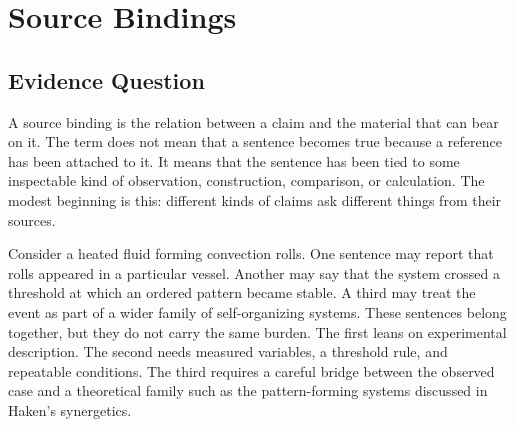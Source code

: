 \documentclass[11pt,a4paper,openany]{book}
\begin{document}
\section{Source Bindings}
\subsection{Evidence Question}
A source binding is the relation between a claim and the material that can bear on it. The term does not mean that a sentence becomes true because a reference has been attached to it. It means that the sentence has been tied to some inspectable kind of observation, construction, comparison, or calculation. The modest beginning is this: different kinds of claims ask different things from their sources. \cite{haken_synergetics,nicolis_prigogine_selforg}\par
Consider a heated fluid forming convection rolls. One sentence may report that rolls appeared in a particular vessel. Another may say that the system crossed a threshold at which an ordered pattern became stable. A third may treat the event as part of a wider family of self-organizing systems. These sentences belong together, but they do not carry the same burden. The first leans on experimental description. The second needs measured variables, a threshold rule, and repeatable conditions. The third requires a careful bridge between the observed case and a theoretical family such as the pattern-forming systems discussed in Haken's synergetics.\par
\end{document}

